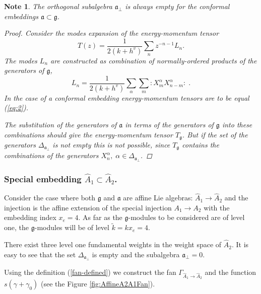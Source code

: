 \documentclass[12pt]{iopart}
\newtheorem{mynote}{Note}[section]
\theoremstyle{definition}
\newcommand{\af}{\mathfrak{a}}
\newcommand{\afb}{\mathfrak{a}_{\bot}}
\begin{document}
\begin{mynote} The orthogonal subalgebra $\afb$ is always empty for the conformal embeddings $\af\subset \mathfrak{g}$.
\begin{proof}
Consider the modes expansion of the energy-momentum tensor
\begin{equation*}
\label{eq:47}
  T(z)=\frac{1}{2(k+h^v)}\sum_n z^{-n-1}L_n.
\end{equation*}
The modes $L_n$ are constructed as combination of normally-ordered products of the generators of $\mathfrak{g}$,
\begin{equation*}
\label{eq:48}
  L_n=\frac{1}{2(k+h^v)}\sum_{\alpha}\sum_m:X^{\alpha}_m X^{\alpha}_{n-m}: \; .
\end{equation*}
In the case of a conformal embedding energy-momentum tensors are to be equal (\ref{eq:2}).

The substitution of the generators of $\af$  in terms of the generators of $\mathfrak{g}$ into these combinations  should give the energy-momentum tensor $T_{\mathfrak{g}}$. But if the set of the generators $\Delta_{\afb}$ is not empty this is not possible, since $T_{\mathfrak{g}}$ contains the combinations of the generators $X^{\alpha}_n, \; \alpha\in \Delta_{\afb}$.
\end{proof}
\end{mynote}
\subsubsection{Special embedding $\hat{A}_1\subset\hat{A}_2$.}
\label{sec:spec-embedd-hata_1s}

Consider the case where both $\mathfrak{g}$ and $\af$ are affine Lie algebras:
$\hat{A}_1 \longrightarrow \hat{A}_2$ and the injection is the affine extension of the
special injection $A_1 \longrightarrow A_2$ with the embedding index $x_e=4$.
As far as the $\mathfrak{g}$-modules to be considered are of level one,
the $\mathfrak{g}$-modules will be of level $\tilde{k}=kx_e=4$.

There exist three level one fundamental weights in the weight space of $\hat{A}_2$.
It is easy to see that the set $\Delta_{\afb}$ is empty and the subalgebra $\afb=0$.

Using the definition (\ref{fan-defined})  we construct the fan $\Gamma_{\hat A_1\to\hat A_2}$
and the function $s(\gamma+\gamma_0)$ (see the Figure \ref{fig:AffineA2A1Fan}).
\end{document}
